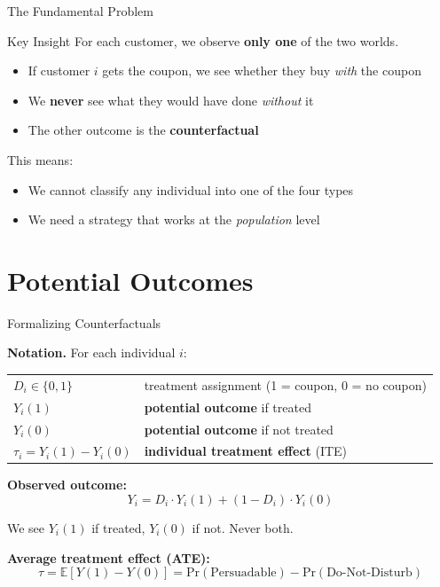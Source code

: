 \documentclass[aspectratio=169, 11pt, handout]{beamer}
\newcommand{\E}{\mathbb{E}}
\newcommand{\Prob}{\mathrm{Pr}}
\begin{document}
\begin{frame}{The Fundamental Problem}

\begin{alertblock}{Key Insight}
For each customer, we observe \textbf{only one} of the two worlds.
\end{alertblock}

\bigskip

\begin{itemize}
    \item If customer $i$ gets the coupon, we see whether they buy \emph{with} the coupon
    \item We \textbf{never} see what they would have done \emph{without} it
    \item The other outcome is the \textbf{counterfactual}
\end{itemize}

\bigskip
\pause

This means:
\begin{itemize}
    \item We cannot classify any individual into one of the four types
    \item We need a strategy that works at the \emph{population} level
\end{itemize}
\end{frame}

\section{Potential Outcomes}

\begin{frame}{Formalizing Counterfactuals}

\textbf{Notation.} For each individual $i$:

\bigskip

\begin{tabular}{ll}
$D_i \in \{0, 1\}$ & treatment assignment (1 = coupon, 0 = no coupon) \\[0.3em]
$Y_i(1)$ & \textbf{potential outcome} if treated \\[0.3em]
$Y_i(0)$ & \textbf{potential outcome} if not treated \\[0.3em]
$\tau_i = Y_i(1) - Y_i(0)$ & \textbf{individual treatment effect} (ITE)
\end{tabular}

\bigskip
\pause

\textbf{Observed outcome:}
\[
Y_i = D_i \cdot Y_i(1) + (1 - D_i) \cdot Y_i(0)
\]

We see $Y_i(1)$ if treated, $Y_i(0)$ if not. Never both.

\bigskip

\textbf{Average treatment effect (ATE):}
\[
\tau = \E[Y(1) - Y(0)] = \Prob(\text{Persuadable}) - \Prob(\text{Do-Not-Disturb})
\]
\end{frame}
\end{document}
